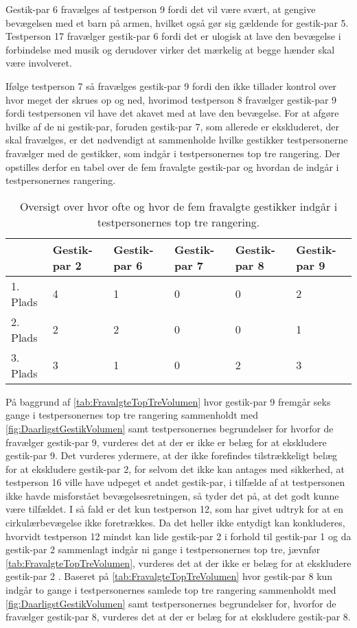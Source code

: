 Gestik-par 6 fravælges af testperson 9 fordi det vil være svært, at gengive bevægelsen med et barn på armen, hvilket også gør sig gældende for gestik-par 5. Testperson 17 fravælger gestik-par 6 fordi det er ulogisk at lave den bevægelse i forbindelse med musik og derudover virker det mærkelig at begge hænder skal være involveret. 

Ifølge testperson 7 så fravælges gestik-par 9 fordi den ikke tillader kontrol over hvor meget der skrues op og ned, hvorimod testperson 8 fravælger gestik-par 9 fordi testpersonen vil have det akavet med at lave den bevægelse.\blankline
%
For at afgøre hvilke af de ni gestik-par, foruden gestik-par 7, som allerede er ekskluderet, der skal fravælges, er det nødvendigt at sammenholde hvilke gestikker testpersonerne fravælger med de gestikker, som indgår i testpersonernes top tre rangering. Der opstilles derfor en tabel over de fem fravalgte gestik-par og hvordan de indgår i testpersonernes rangering.    
%
\begin{table}[H]
	\centering
	\begin{tabular}{ | p{1.5cm} | p{2.1cm} | p{2.1cm} | p{2.1cm} | p{2.1cm} | p{2.1cm} |}
	\hline
		 & Gestik-par 2 & Gestik-par 6 & Gestik-par 7 & Gestik-par 8 & Gestik-par 9 \\ \hline
		1. Plads & 4 & 1 & 0 & 0 & 2\\ \hline
		2. Plads & 2 & 2 & 0 & 0 & 1\\ \hline
		3. Plads & 3 & 1 & 0 & 2 & 3\\ \hline
	\end{tabular}
	\caption{Oversigt over hvor ofte og hvor de fem fravalgte gestikker indgår i testpersonernes top tre rangering.}
	\label{tab:FravalgteTopTreVolumen}
\end{table}
\noindent
%
På baggrund af \autoref{tab:FravalgteTopTreVolumen} hvor gestik-par 9 fremgår seks gange i testpersonernes top tre rangering sammenholdt med \autoref{fig:DaarligstGestikVolumen} samt testpersonernes begrundelser for hvorfor de fravælger gestik-par 9, vurderes det at der er ikke er belæg for at ekskludere gestik-par 9. Det vurderes ydermere, at der ikke forefindes tilstrækkeligt belæg for at ekskludere gestik-par 2, for selvom det ikke kan antages med sikkerhed, at testperson 16 ville have udpeget et andet gestik-par, i tilfælde af at testpersonen ikke havde misforstået bevægelsesretningen, så tyder det på, at det godt kunne være tilfældet. I så fald er det kun testperson 12, som har givet udtryk for at en cirkulærbevægelse ikke foretrækkes. Da det heller ikke entydigt kan konkluderes, hvorvidt testperson 12 mindst kan lide gestik-par 2 i forhold til gestik-par 1 og da gestik-par 2 sammenlagt indgår ni gange i testpersonernes top tre, jævnfør \autoref{tab:FravalgteTopTreVolumen}, vurderes det at der ikke er belæg for at ekskludere gestik-par 2 .\blankline 
%
Baseret på \autoref{tab:FravalgteTopTreVolumen} hvor gestik-par 8 kun indgår to gange i testpersonernes samlede top tre rangering sammenholdt med \autoref{fig:DaarligstGestikVolumen} samt testpersonernes begrundelser for, hvorfor de fravælger gestik-par 8, vurderes det at der er belæg for at ekskludere gestik-par 8.  

